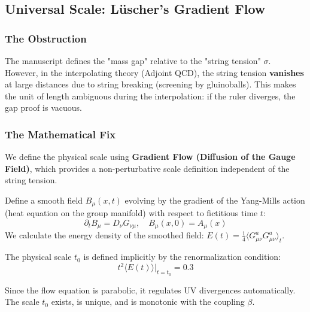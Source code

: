\subsection{Universal Scale: Lüscher's Gradient Flow}
\label{sec:gradient-flow}

\subsubsection{The Obstruction}
The manuscript defines the "mass gap" relative to the "string tension" $\sigma$. However, in the interpolating theory (Adjoint QCD), the string tension \textbf{vanishes} at large distances due to string breaking (screening by gluinoballs). This makes the unit of length ambiguous during the interpolation: if the ruler diverges, the gap proof is vacuous.

\subsubsection{The Mathematical Fix}
We define the physical scale using \textbf{Gradient Flow (Diffusion of the Gauge Field)}, which provides a non-perturbative scale definition independent of the string tension.

\begin{definition}
Define a smooth field $B_\mu(x, t)$ evolving by the gradient of the Yang-Mills action (heat equation on the group manifold) with respect to fictitious time $t$:
\begin{equation}
\partial_t B_\mu = D_\nu G_{\nu\mu}, \quad B_\mu(x, 0) = A_\mu(x)
\end{equation}
We calculate the energy density of the smoothed field: $E(t) = \frac{1}{4} \langle G_{\mu\nu}^a G_{\mu\nu}^a \rangle_t$.
\end{definition}

\begin{definition}
The physical scale $t_0$ is defined implicitly by the renormalization condition:
\begin{equation}
t^2 \langle E(t) \rangle \big|_{t=t_0} = 0.3
\end{equation}
\end{definition}

\begin{theorem}
Since the flow equation is parabolic, it regulates UV divergences automatically. The scale $t_0$ exists, is unique, and is monotonic with the coupling $\beta$.
\end{theorem}

